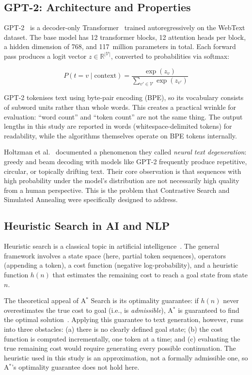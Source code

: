 \documentclass[12pt]{article}
\begin{document}
	\subsection{GPT-2: Architecture and Properties}
	
	GPT-2~\cite{radford2019gpt2} is a decoder-only Transformer~\cite{vaswani2017attention} trained autoregressively on the WebText dataset. The base model has 12 transformer blocks, 12 attention heads per block, a hidden dimension of 768, and 117~million parameters in total. Each forward pass produces a logit vector $z \in \mathbb{R}^{|\mathcal{V}|}$, converted to probabilities via softmax:
	
	\begin{equation}
		P(t = v \mid \text{context}) = \frac{\exp(z_v)}{\sum_{v' \in \mathcal{V}} \exp(z_{v'})}
		\label{eq:softmax}
	\end{equation}
	
	GPT-2 tokenises text using byte-pair encoding (BPE), so its vocabulary consists of subword units rather than whole words. This creates a practical wrinkle for evaluation: ``word count'' and ``token count'' are not the same thing. The output lengths in this study are reported in words (whitespace-delimited tokens) for readability, while the algorithms themselves operate on BPE tokens internally.
	
	Holtzman et al.~\cite{holtzman2020curious} documented a phenomenon they called \emph{neural text degeneration}: greedy and beam decoding with models like GPT-2 frequently produce repetitive, circular, or topically drifting text. Their core observation is that sequences with high probability under the model's distribution are not necessarily high quality from a human perspective. This is the problem that Contrastive Search and Simulated Annealing were specifically designed to address.
	
	\subsection{Heuristic Search in AI and NLP}
	
	Heuristic search is a classical topic in artificial intelligence~\cite{russellnorvig2020ai}. The general framework involves a state space (here, partial token sequences), operators (appending a token), a cost function (negative log-probability), and a heuristic function $h(n)$ that estimates the remaining cost to reach a goal state from state $n$.
	
	The theoretical appeal of A$^*$ Search is its optimality guarantee: if $h(n)$ never overestimates the true cost to goal (i.e., is \emph{admissible}), A$^*$ is guaranteed to find the optimal solution~\cite{hart1968astar}. Applying this guarantee to text generation, however, runs into three obstacles: (a) there is no clearly defined goal state; (b) the cost function is computed incrementally, one token at a time; and (c) evaluating the true remaining cost would require generating every possible continuation. The heuristic used in this study is an approximation, not a formally admissible one, so A$^*$'s optimality guarantee does not hold here.
	
\end{document}
